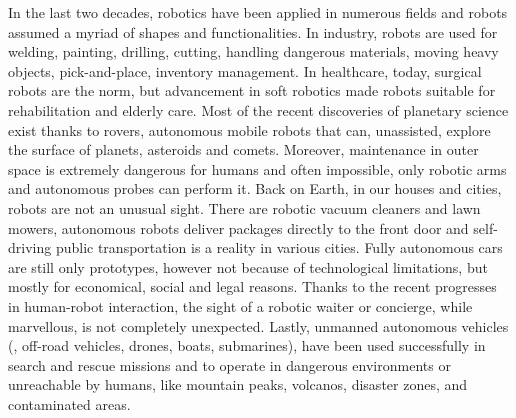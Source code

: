 In the last two decades, robotics have been applied in numerous fields and robots assumed a myriad of shapes and functionalities. In industry, robots are used for welding, painting, drilling, cutting, handling dangerous materials, moving heavy objects, pick-and-place, inventory management. In healthcare, today, surgical robots are the norm, but advancement in soft robotics made robots suitable for rehabilitation and elderly care. Most of the recent discoveries of planetary science exist thanks to rovers, autonomous mobile robots that can, unassisted, explore the surface of planets, asteroids and comets. Moreover, maintenance in outer space is extremely dangerous for humans and often impossible, only robotic arms and autonomous probes can perform it. Back on Earth, in our houses and cities, robots are not an unusual sight. There are robotic vacuum cleaners and lawn mowers,  autonomous robots deliver packages directly to the front door and self-driving public transportation is a reality in various cities. Fully autonomous cars are still only prototypes, however not because of technological limitations, but mostly for economical, social and legal reasons. Thanks to the recent progresses in human-robot interaction, the sight of a robotic waiter or concierge, while marvellous, is not completely unexpected. Lastly, unmanned autonomous vehicles (\eg, off-road vehicles, drones, boats, submarines),  have been used successfully in search and rescue missions and to operate in dangerous environments or unreachable by humans, like mountain peaks, volcanos, disaster zones, and contaminated areas.

